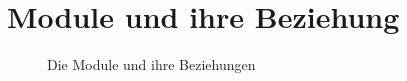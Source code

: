 \chapter{Module und ihre Beziehung}
\begin{figure}[htb]
 \centering
 \caption{\label{modules}Die Module und ihre Beziehungen}
\end{figure}
